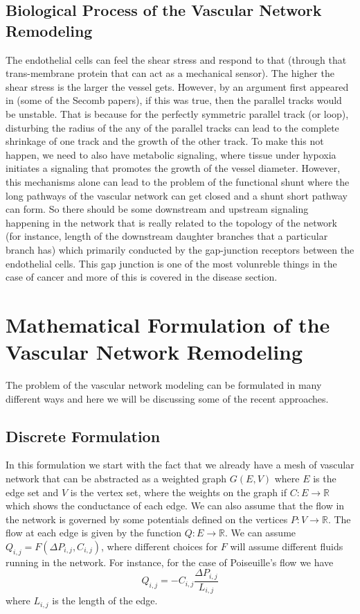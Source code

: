 \documentclass[10pt,a4paper,twocolumn]{article}
\newcommand{\R}{\mathbb{R}}
\begin{document}
	\subsection{Biological Process of the Vascular Network Remodeling}
	The endothelial cells can feel the shear stress and respond to that (through that trans-membrane protein that can act as a mechanical sensor). The higher the shear stress is the larger the vessel gets. However, by an argument first appeared in (some of the Secomb papers), if this was true, then the parallel tracks would be unstable. That is because for the perfectly symmetric parallel track (or loop), disturbing the radius of the any of the parallel tracks can lead to the complete shrinkage of one track and the growth of the other track. To make this not happen, we need to also have metabolic signaling, where tissue under hypoxia initiates a signaling that promotes the growth of the vessel diameter. However, this mechanisms alone can lead to the problem of the functional shunt where the long pathways of the vascular network can get closed and a shunt short pathway can form. So there should be some downstream and upstream signaling happening in the network that is really related to the topology of the network (for instance, length of the downstream daughter branches that a particular branch has) which primarily conducted by the gap-junction receptors between the endothelial cells. This gap junction is one of the most volunreble things in the case of cancer and more of this is covered in the disease section.
	
	
	\section{Mathematical Formulation of the Vascular Network Remodeling}
	The problem of the vascular network modeling can be formulated in many different ways and here we will be discussing some of the recent approaches. 
	
	\subsection{Discrete Formulation}
	In this formulation we start with the fact that we already have a mesh of vascular network that can be abstracted as a weighted graph $ G(E,V) $ where $ E $ is the edge set and $ V $ is the vertex set, where the weights on the graph if $ C: E \to \R $ which shows the conductance of each edge. We can also assume that the flow in the network is governed by some potentials defined on the vertices $ P: V \to \R $. The flow at each edge is given by the function $ Q: E \to \R $. We can assume $ Q_{i,j} = F(\Delta P_{i,j},C_{i,j}) $, where different choices for $ F $ will assume different fluids running in the network. For instance, for the case of Poiseuille's flow we have
	\[ Q_{i,j} = -C_{i,j} \frac{\Delta P_{i,j}}{L_{i,j}} \]
	where $ L_{i,j} $ is the length of the edge.
	
\end{document}
